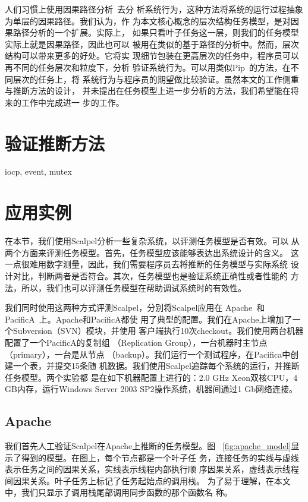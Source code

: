 人们习惯上使用因果路径分析~\cite{pinpoint, project5, pip, magpie}去分
析系统行为，这种方法将系统的运行过程抽象为单层的因果路径。我们认为，作
为本文核心概念的层次结构任务模型，是对因果路径分析的一个扩展。实际上，
如果只看叶子任务这一层，则我们的任务模型实际上就是因果路径，因此也可以
被用在类似的基于路径的分析中。然而，层次结构可以带来更多的好处。它将实
现细节包装在更高层次的任务中，程序员可以再不同的任务层次和粒度下，分析
验证系统行为。可以用类似Pip~\cite{pip}的方法，在不同层次的任务上，将
系统行为与程序员的期望做比较验证。虽然本文的工作侧重与推断方法的设计，
并未提出在任务模型上进一步分析的方法，我们希望能在将来的工作中完成进一
步的工作。

\section{验证推断方法}

iocp, event, mutex

\section{应用实例}

在本节，我们使用Scalpel分析一些复杂系统，以评测任务模型是否有效。可以
从两个方面来评测任务模型。首先，任务模型应该能够表达出系统设计的含义。
这一点很难用数字测量，因此，我们需要程序员去将推断的任务模型与实际系统
设计对比，判断两者是否符合。其次，任务模型也是验证系统正确性或者性能的
方法，所以，我们也可以评测任务模型在帮助调试系统时的有效性。

我们同时使用这两种方式评测Scalpel，分别将Scalpel应用在
Apache~\cite{apache}和PacificA~\cite{pacifica}上。Apache和PacificA都使
用了典型的配置。我们在Apache上增加了一个Subversion（SVN）模块，并使用
客户端执行10次checkout。我们使用两台机器配置了一个PacificA的复制组
（Replication Group），一台机器时主节点（primary），一台是从节点
（backup）。我们运行一个测试程序，在Pacifica中创建一个表，并提交15条随
机数据。我们使用Scalpel追踪每个系统的运行，并推断任务模型。两个实验都
是在如下机器配置上进行的：2.0 GHz Xeon双核CPU，4 GB内存，运行Windows
Server 2003 SP2操作系统，机器间通过1 Gb网络连接。

\subsection{Apache}

我们首先人工验证Scalpel在Apache上推断的任务模型。图~
\ref{fig:apache_model}显示了得到的模型。在图上，每个节点都是一个叶子任
务，连接任务的实线与虚线表示任务之间的因果关系，实线表示线程内部执行顺
序因果关系，虚线表示线程间因果关系。叶子任务上标记了任务起始点的调用栈。
为了易于理解，在本文中，我们只显示了调用栈尾部调用同步函数的那个函数名
称。

